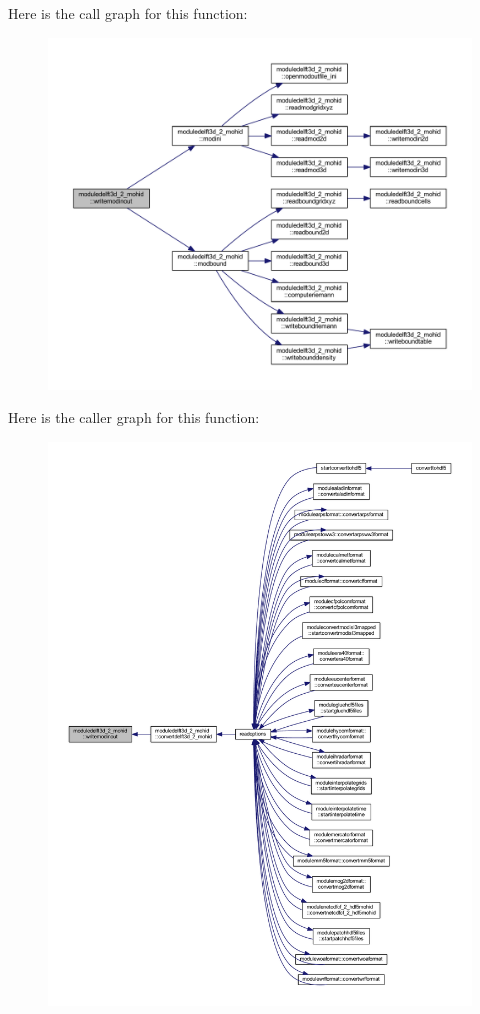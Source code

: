 Here is the call graph for this function\+:\nopagebreak
\begin{figure}[H]
\begin{center}
\leavevmode
\includegraphics[width=350pt]{namespacemoduledelft3d__2__mohid_aec1314b8bd41c0bb55a2be43ece5267d_cgraph}
\end{center}
\end{figure}
Here is the caller graph for this function\+:\nopagebreak
\begin{figure}[H]
\begin{center}
\leavevmode
\includegraphics[width=350pt]{namespacemoduledelft3d__2__mohid_aec1314b8bd41c0bb55a2be43ece5267d_icgraph}
\end{center}
\end{figure}
